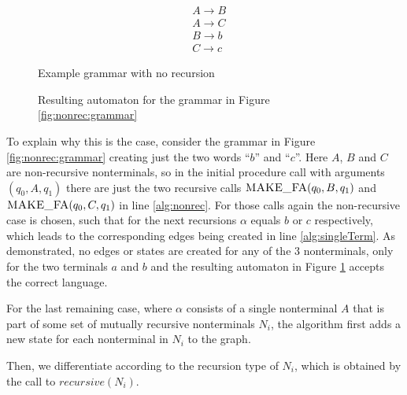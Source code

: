 \begin{figure}[!h]
	\begin{minipage}[b]{.45\linewidth}
		\begin{align*}
			&A \rightarrow B\\
			&A \rightarrow C\\
			&B \rightarrow b\\
			&C \rightarrow c
		\end{align*}
		\caption{Example grammar with no recursion}
		\label{fig:nonrec:grammar}
	\end{minipage}
	\hfill
	\begin{minipage}[b]{.45\linewidth}
		\caption{Resulting automaton for the grammar in Figure \ref{fig:nonrec:grammar}}
		\label{fig:nonrec:automaton}
	\end{minipage}
\end{figure}


To explain why this is the case, consider the grammar in Figure \ref{fig:nonrec:grammar} creating just the two words \enquote{$b$} and \enquote{$c$}. Here $A$, $B$ and $C$ are non-recursive nonterminals, so in the initial procedure call with arguments $(q_0, A, q_1)$ there are just the two recursive calls $\textproc{MAKE\_FA}(q_0, B, q_1)$ and $\textproc{MAKE\_FA}(q_0, C, q_1)$ in line \ref{alg:nonrec}. For those calls again the non-recursive case is chosen, such that for the next recursions $\alpha$ equals $b$ or $c$ respectively, which leads to the corresponding edges being created in line \ref{alg:singleTerm}. As demonstrated, no edges or states are created for any of the 3 nonterminals, only for the two terminals $a$ and $b$ and the resulting automaton in Figure \ref{fig:nonrec:automaton} accepts the correct language.

For the last remaining case, where $\alpha$ consists of a single nonterminal $A$ that is part of some set of mutually recursive nonterminals $N_i$, the algorithm first adds a new state for each nonterminal in $N_i$ to the graph.

Then, we differentiate according to the recursion type of $N_i$, which is obtained by the call to $recursive(N_i)$.

